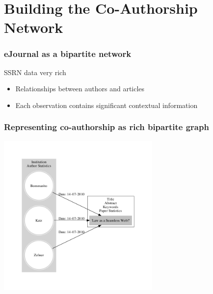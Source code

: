 \documentclass[xcolor=dvipsnames, 9pt]{beamer}
\begin{document}
\section{Building the Co-Authorship Network} %
\label{sec:building_the_co_authorship_network}

\begin{frame}[fragile]
    \frametitle{eJournal as a bipartite network}
    SSRN data very rich
    \begin{itemize}
        \item Relationships between authors and articles
        \item Each observation contains significant contextual information
    \end{itemize}
\end{frame}

\begin{frame}[fragile]
    \frametitle{Representing co-authorship as rich bipartite graph}
    \begin{center}
        \includegraphics[width=8cm]{images/ssrn_graph.pdf}
    \end{center}
\end{frame}
\end{document}

